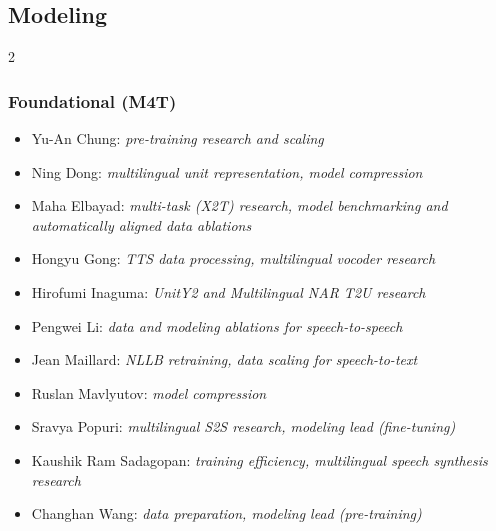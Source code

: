 \newpage
\subsection*{Modeling}
\begin{multicols}{2}

\subsubsection*{Foundational (M4T)} 
\begin{itemize}[itemsep=0.00cm,parsep=0.0cm,left=0pt, label={}]
    \item{Yu-An Chung}: \textit{pre-training research and scaling}
    \item Ning Dong: \textit{multilingual unit representation, model compression}
  \item Maha Elbayad: \textit{multi-task (X2T) research, model benchmarking and automatically aligned data ablations}
  \item Hongyu Gong: \textit{TTS data processing, multilingual vocoder research}
  \item Hirofumi Inaguma: \textit{UnitY2 and Multilingual NAR T2U research}
  \item Pengwei Li:  \textit{data and modeling ablations for speech-to-speech}
  \item Jean Maillard: \textit{NLLB retraining, data scaling for speech-to-text}
  \item Ruslan Mavlyutov: \textit{model compression}
  \item Sravya Popuri: \textit{multilingual S2S research, modeling lead (fine-tuning)}
  \item Kaushik Ram Sadagopan: \textit{training efficiency, multilingual speech synthesis research}
  \item Changhan Wang: \textit{data preparation, modeling lead (pre-training)}
\end{itemize}
\vspace*{\fill}
\columnbreak


\end{multicols}
